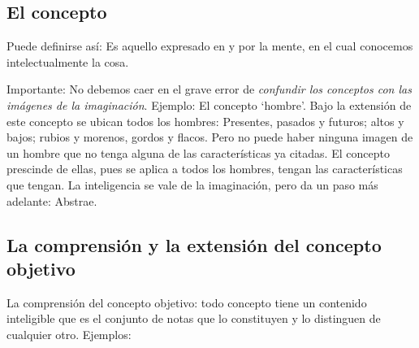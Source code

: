 \documentclass{article}
\begin{document}
\subsection{El concepto}
    Puede definirse así: Es aquello expresado en y por la mente, en el cual conocemos intelectualmente la cosa. \par 
    [Algunos han dividido al concepto en: Concepto formal (o subjetivo o mental) y el concepto objetivo (u objeto del concepto). El concepto formal es aquello \emph{en el} que entendemos algo; el concepto objetivo es \emph{lo que} inmediatamente entendemos en el concepto formal. \par 
    Ejemplo: el concepto `triangulo'. Por un lado es algo producido en y por nuestro intelecto: un producto psíquico y ése es el concepto formal o subjetivo o mental; por otro lado es la presencia en nuestra mente de algo totalmente distinto de la naturaleza de esa mente y de sus actos: Es la presencia de una esencia geométrica objetiva, que pertenece no al reino de lo psíquico, sino al reino de lo matemático, y esto último es el concepto objetivo u objeto de concepto. Podríamos llamarlo también concepto concipiente al formal o subjetivo, y concepto concebido al objetivo u objeto de concepto. \par 
    El concepto objetivo puede decirse que es concepto sólo analógicamente, pues es lo conocido en el concepto formal. \par
    A la Lógica le interesan los conceptos objetivos, pues en ellos se apoyan las relaciones de razón (o racionales)] \par
    Importante: No debemos caer en el grave error de \emph{confundir los conceptos con las imágenes de la imaginación}. Ejemplo: El concepto `hombre'. Bajo la extensión de este concepto se ubican todos los hombres: Presentes, pasados y futuros; altos y bajos; rubios y morenos, gordos y flacos. Pero no puede haber ninguna imagen de un hombre que no tenga alguna de las características ya citadas. El concepto prescinde de ellas, pues se aplica a todos los hombres, tengan las características que tengan. La inteligencia se vale de la imaginación, pero da un paso más adelante: Abstrae. \par

\newpage

\subsection{La comprensión y la extensión del concepto objetivo}
    La comprensión  del concepto objetivo: todo concepto tiene un contenido inteligible que es el conjunto de notas que lo constituyen y lo distinguen de cualquier otro. Ejemplos: \par
    
\end{document}
